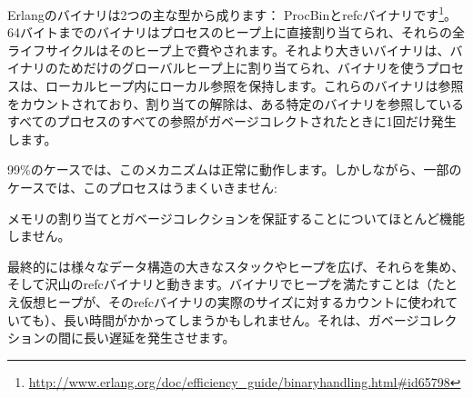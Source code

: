Erlangのバイナリは2つの主な型から成ります： ProcBinとrefcバイナリです\footnote{\href{http://www.erlang.org/doc/efficiency\_guide/binaryhandling.html\#id65798}{http://www.erlang.org/doc/efficiency\_guide/binaryhandling.html\#id65798}}。64バイトまでのバイナリはプロセスのヒープ上に直接割り当てられ、それらの全ライフサイクルはそのヒープ上で費やされます。それより大きいバイナリは、バイナリのためだけのグローバルヒープ上に割り当てられ、バイナリを使うプロセスは、ローカルヒープ内にローカル参照を保持します。これらのバイナリは参照をカウントされており、割り当ての解除は、ある特定のバイナリを参照しているすべてのプロセスのすべての参照がガベージコレクトされたときに1回だけ発生します。

99\%のケースでは、このメカニズムは正常に動作します。しかしながら、一部のケースでは、このプロセスはうまくいきません:

\begin{enumerate*}
	\item メモリの割り当てとガベージコレクションを保証することについてほとんど機能しません。
         \item 最終的には様々なデータ構造の大きなスタックやヒープを広げ、それらを集め、そして沢山のrefcバイナリと動きます。バイナリでヒープを満たすことは（たとえ仮想ヒープが、そのrefcバイナリの実際のサイズに対するカウントに使われていても）、長い時間がかかってしまうかもしれません。それは、ガベージコレクションの間に長い遅延を発生させます。
\end{enumerate*}

